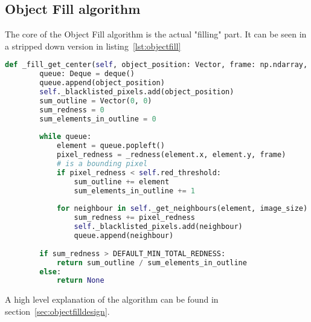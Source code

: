 \subsection{Object Fill algorithm}\label{solution:objfillalgo}

The core of the Object Fill algorithm is the actual "filling" part.
It can be seen in a stripped down version in listing~\ref{lst:objectfill}

\begin{lstlisting}[language=Python,label={lst:objectfill},caption={Stripped version of thresh moment from thresh\_moment.py}]
    def _fill_get_center(self, object_position: Vector, frame: np.ndarray, image_size: Vector) -> Optional[Vector]:
	    queue: Deque = deque()
	    queue.append(object_position)
	    self._blacklisted_pixels.add(object_position)
	    sum_outline = Vector(0, 0)
	    sum_redness = 0
	    sum_elements_in_outline = 0
	    
	    while queue:
		    element = queue.popleft()
		    pixel_redness = _redness(element.x, element.y, frame)
		    # is a bounding pixel
		    if pixel_redness < self.red_threshold:
			    sum_outline += element
			    sum_elements_in_outline += 1
		    
		    for neighbour in self._get_neighbours(element, image_size) - self._blacklisted_pixels:
			    sum_redness += pixel_redness
			    self._blacklisted_pixels.add(neighbour)
			    queue.append(neighbour)
	    
	    if sum_redness > DEFAULT_MIN_TOTAL_REDNESS:
		    return sum_outline / sum_elements_in_outline
	    else:
		    return None
\end{lstlisting}

A high level explanation of the algorithm can be found in section~\ref{sec:objectfilldesign}.